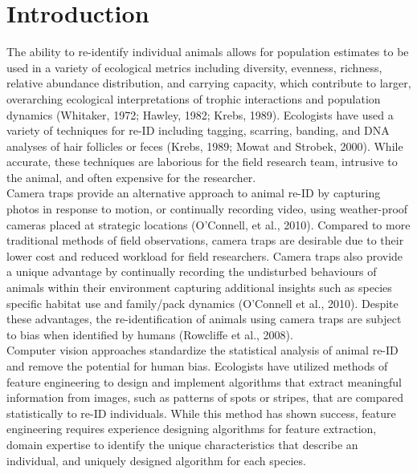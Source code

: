 \documentclass[11pt]{article}
\begin{document}
\section*{Introduction}

The ability to re-identify individual animals allows for population estimates to be used in a variety of ecological metrics including diversity, evenness, richness, relative abundance distribution, and carrying capacity, which contribute to larger, overarching ecological interpretations of trophic interactions and population dynamics (Whitaker, 1972; Hawley, 1982; Krebs, 1989). Ecologists have used a variety of techniques for re-ID including tagging, scarring, banding, and DNA analyses of hair follicles or feces (Krebs, 1989; Mowat and Strobek, 2000). While accurate, these techniques are laborious for the field research team, intrusive to the animal, and often expensive for the researcher.
\newline
\\
Camera traps provide an alternative approach to animal re-ID by capturing photos in response to motion, or continually recording video, using weather-proof cameras placed at strategic locations (O'Connell, et al., 2010). Compared to more traditional methods of field observations, camera traps are desirable due to their lower cost and reduced workload for field researchers. Camera traps also provide a unique advantage by continually recording the undisturbed behaviours of animals within their environment capturing additional insights such as species specific habitat use and family/pack dynamics (O'Connell et al., 2010). Despite these advantages, the re-identification of animals using camera traps are subject to bias when identified by humans (Rowcliffe et al., 2008).
\newline
\\
Computer vision approaches standardize the statistical analysis of animal re-ID and remove the potential for human bias. Ecologists have utilized methods of feature engineering to design and implement algorithms that extract meaningful information from images, such as patterns of spots or stripes, that are compared statistically to re-ID individuals. While this method has shown success, feature engineering requires experience designing algorithms for feature extraction, domain expertise to identify the unique characteristics that describe an individual, and uniquely designed algorithm for each species.
\newline
\\
\end{document}
